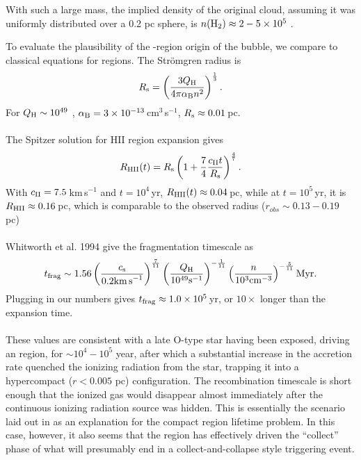 \documentclass{aa}
\begin{document}
With such a large mass, the implied density of the original cloud, assuming it
was uniformly distributed over a 0.2 pc sphere, is $n(\textrm{H}_{2}) \approx 2-5\times10^{5}$
\percc.

To evaluate the plausibility of the \hii-region origin of the bubble, we compare
to classical equations for \hii regions.
The Str\"omgren radius is \\
\begin{eqnarray}
R_{\rm s}=\left(\frac{3Q_{\rm H}}{4\pi\alpha_{\rm B} n^{2}}\right)^{\frac{1}{3}}.
\end{eqnarray} 
For $Q_{\rm H}\sim10^{49}$ \pers, $\alpha_{\rm B}=3\times10^{-13}$\,cm$^{3}$\,s$^{-1}$, $R_{\rm s}\approx0.01$\,pc.\\
\\
The Spitzer solution for HII region expansion gives\\
\begin{eqnarray}
R_{\rm HII}(t)=R_{\rm s}\left(1+\frac{7}{4}\frac{c_{\rm II}t}{R_{\rm s}}\right)^{\frac{4}{7}}.
\end{eqnarray} 
With $c_{\rm II}=7.5$\,km\,s$^{-1}$ and $t=10^{4}$\,yr,
$R_{\rm HII}(t)\approx0.04$\,pc, while at $t=10^5$\,yr, it is $R_{\rm
HII}\approx0.16$\,pc, which is comparable to the observed radius
($r_{obs} \sim 0.13-0.19$ pc)\\
\\
Whitworth et al. 1994 give the fragmentation timescale as
\begin{eqnarray}
t_{\rm frag}\sim1.56\left(\frac{c_{\rm s}}{0.2{\rm km\,s}^{-1}}\right)^{\frac{7}{11}}\left(\frac{Q_{\rm H}}{10^{49}{\rm s}^{-1}}\right)^{-\frac{1}{11}}\left(\frac{n}{10^{3}{\rm cm}^{-3}}\right)^{-\frac{5}{11}}{\rm Myr}.
\end{eqnarray} 
Plugging in our numbers gives $t_{\rm frag}\approx1.0\times10^{5}$\,yr, or
$10\times$ longer than the expansion time.\\
\\

These values are consistent with a late O-type star having been exposed,
driving an \hii region, for $\sim10^4-10^5$ year, after which a substantial
increase in the accretion rate quenched the ionizing radiation from the star,
trapping it into a hypercompact ($r<0.005$ pc) configuration.  The
recombination timescale is short enough that the ionized gas would disappear
almost immediately after the continuous ionizing radiation source was hidden.
This is essentially the scenario laid out in \citet{de-Pree2014a} as an
explanation for the compact \hii region lifetime problem.  In this case,
however, it also seems that the \hii region has effectively driven the
``collect'' phase of what will presumably end in a collect-and-collapse style
triggering event.
\end{document}
